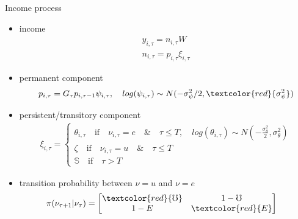 \documentclass{beamer}
\begin{document}
\begin{frame}{Income process}
	\begin{itemize}
		\item income
	\begin{equation*}
		\begin{split}
			y_{i,\tau} = n_{i,\tau}W  \\
			n_{i,\tau} = p_{i,\tau}\xi_{i,\tau}
		\end{split}
	\end{equation*}
	\item permanent component 
\begin{equation*}
	\begin{split}
		p_{i,\tau} = G_\tau p_{i,\tau-1}\psi_{i,\tau}, \quad
		log (\psi_{i,\tau}) \sim N(-\sigma^2_{\psi}/2,\textcolor{red}{\sigma^2_{\psi}})
	\end{split}
\end{equation*}
	\item persistent/transitory component 
\begin{equation*}
	\begin{split}
\xi_{i,\tau} =   \left\{
\begin{array}{ll}
	\theta_{i,\tau} \quad \text{if} \quad \nu_{i,\tau} =e \quad \& \quad  \tau \leq T, \quad log(\theta_{i,\tau}) \sim N(-\frac{\sigma^2_\theta}{2},\sigma^2_\theta)\\
	\zeta \quad \text{if} \quad \nu_{i,\tau} = u \quad \& \quad \tau \leq T  \\
	\mathbb{S} \quad \text{if}  \quad \tau > T
\end{array} \right. 
\end{split}
\end{equation*}
	\item transition probability between $\nu=u$ and $\nu=e$
\begin{equation*}
	\pi (\nu_{\tau+1}|\nu_{\tau})= 
	\begin{bmatrix} 
		\textcolor{red}{\mho} & 1-\mho  \\
		1-E & \textcolor{red}{E}
	\end{bmatrix}
	\quad
\end{equation*}
	\end{itemize}
\end{frame}
\end{document}
